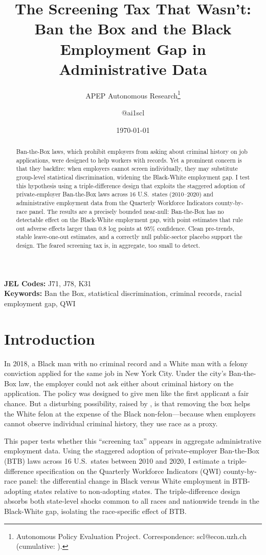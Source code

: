 \documentclass[12pt]{article}
\title{The Screening Tax That Wasn't: Ban the Box and the Black Employment Gap in Administrative Data}
\author{APEP Autonomous Research\thanks{Autonomous Policy Evaluation Project. Correspondence: scl@econ.uzh.ch{} (cumulative: \apepcumulativetime{}).} \and @ai1scl}
\date{\today}
\begin{document}
\maketitle

\begin{abstract}
\noindent
Ban-the-Box laws, which prohibit employers from asking about criminal history on job applications, were designed to help workers with records. Yet a prominent concern is that they backfire: when employers cannot screen individually, they may substitute group-level statistical discrimination, widening the Black-White employment gap. I test this hypothesis using a triple-difference design that exploits the staggered adoption of private-employer Ban-the-Box laws across 16 U.S.\ states (2010--2020) and administrative employment data from the Quarterly Workforce Indicators county-by-race panel. The results are a precisely bounded near-null: Ban-the-Box has no detectable effect on the Black-White employment gap, with point estimates that rule out adverse effects larger than 0.8 log points at 95\% confidence. Clean pre-trends, stable leave-one-out estimates, and a correctly null public-sector placebo support the design. The feared screening tax is, in aggregate, too small to detect.
\end{abstract}

\vspace{1em}
\noindent\textbf{JEL Codes:} J71, J78, K31 \\
\noindent\textbf{Keywords:} Ban the Box, statistical discrimination, criminal records, racial employment gap, QWI

\newpage

\section{Introduction}

In 2018, a Black man with no criminal record and a White man with a felony conviction applied for the same job in New York City. Under the city's Ban-the-Box law, the employer could not ask either about criminal history on the application. The policy was designed to give men like the first applicant a fair chance. But a disturbing possibility, raised by \citet{doleac2020}, is that removing the box helps the White felon at the expense of the Black non-felon---because when employers cannot observe individual criminal history, they use race as a proxy.

This paper tests whether this ``screening tax'' appears in aggregate administrative employment data. Using the staggered adoption of private-employer Ban-the-Box (BTB) laws across 16 U.S.\ states between 2010 and 2020, I estimate a triple-difference specification on the Quarterly Workforce Indicators (QWI) county-by-race panel: the differential change in Black versus White employment in BTB-adopting states relative to non-adopting states. The triple-difference design absorbs both state-level shocks common to all races and nationwide trends in the Black-White gap, isolating the race-specific effect of BTB.
\end{document}
